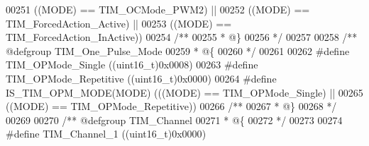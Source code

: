 \begin{DoxyCode}
00251                           \textcolor{preprocessor}{(}\textcolor{preprocessor}{(}\textcolor{preprocessor}{MODE}\textcolor{preprocessor}{)} \textcolor{preprocessor}{==} TIM_OCMode_PWM2\textcolor{preprocessor}{)} \textcolor{preprocessor}{||}
00252                           \textcolor{preprocessor}{(}\textcolor{preprocessor}{(}\textcolor{preprocessor}{MODE}\textcolor{preprocessor}{)} \textcolor{preprocessor}{==} TIM_ForcedAction_Active\textcolor{preprocessor}{)} \textcolor{preprocessor}{||}
00253                           \textcolor{preprocessor}{(}\textcolor{preprocessor}{(}\textcolor{preprocessor}{MODE}\textcolor{preprocessor}{)} \textcolor{preprocessor}{==} TIM_ForcedAction_InActive\textcolor{preprocessor}{)}\textcolor{preprocessor}{)}
00254 \textcolor{comment}{/**}
00255 \textcolor{comment}{  * @\}}
00256 \textcolor{comment}{  */}
00257 
00258 \textcolor{comment}{/** @defgroup TIM\_One\_Pulse\_Mode }
00259 \textcolor{comment}{  * @\{}
00260 \textcolor{comment}{  */}
00261 
00262 \textcolor{preprocessor}{#}\textcolor{preprocessor}{define} \textcolor{preprocessor}{TIM\_OPMode\_Single}                  \textcolor{preprocessor}{(}\textcolor{preprocessor}{(}\textcolor{preprocessor}{uint16\_t}\textcolor{preprocessor}{)}0x0008\textcolor{preprocessor}{)}
00263 \textcolor{preprocessor}{#}\textcolor{preprocessor}{define} \textcolor{preprocessor}{TIM\_OPMode\_Repetitive}              \textcolor{preprocessor}{(}\textcolor{preprocessor}{(}\textcolor{preprocessor}{uint16\_t}\textcolor{preprocessor}{)}0x0000\textcolor{preprocessor}{)}
00264 \textcolor{preprocessor}{#}\textcolor{preprocessor}{define} \textcolor{preprocessor}{IS\_TIM\_OPM\_MODE}\textcolor{preprocessor}{(}\textcolor{preprocessor}{MODE}\textcolor{preprocessor}{)} \textcolor{preprocessor}{(}\textcolor{preprocessor}{(}\textcolor{preprocessor}{(}\textcolor{preprocessor}{MODE}\textcolor{preprocessor}{)} \textcolor{preprocessor}{==} TIM_OPMode_Single\textcolor{preprocessor}{)} \textcolor{preprocessor}{||}
00265                                \textcolor{preprocessor}{(}\textcolor{preprocessor}{(}\textcolor{preprocessor}{MODE}\textcolor{preprocessor}{)} \textcolor{preprocessor}{==} TIM_OPMode_Repetitive\textcolor{preprocessor}{)}\textcolor{preprocessor}{)}
00266 \textcolor{comment}{/**}
00267 \textcolor{comment}{  * @\}}
00268 \textcolor{comment}{  */}
00269 
00270 \textcolor{comment}{/** @defgroup TIM\_Channel }
00271 \textcolor{comment}{  * @\{}
00272 \textcolor{comment}{  */}
00273 
00274 \textcolor{preprocessor}{#}\textcolor{preprocessor}{define} \textcolor{preprocessor}{TIM\_Channel\_1}                      \textcolor{preprocessor}{(}\textcolor{preprocessor}{(}\textcolor{preprocessor}{uint16\_t}\textcolor{preprocessor}{)}0x0000\textcolor{preprocessor}{)}

\end{DoxyCode}
